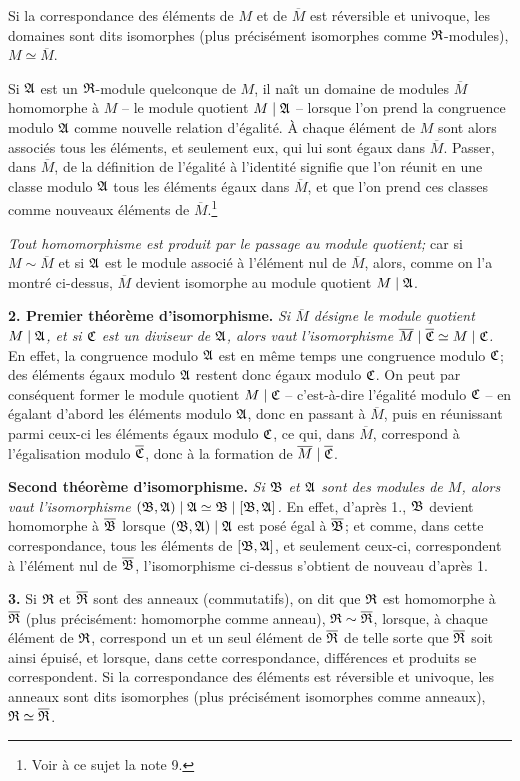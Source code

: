 Si la correspondance des éléments de $M$ et de $\overline M$ est réversible et univoque, les domaines sont dits isomorphes (plus précisément isomorphes comme $\mathfrak{R}$-modules), $M\simeq\overline M$.

Si $\mathfrak{A}$ est un $\mathfrak{R}$-module quelconque de $M$, il naît un domaine de modules $\overline M$ homomorphe à $M$ -- le module quotient $M\mid\mathfrak{A}$ -- lorsque l'on prend la congruence modulo $\mathfrak{A}$ comme nouvelle relation d'égalité. À chaque élément de $M$ sont alors associés tous les éléments, et seulement eux, qui lui sont égaux dans $\overline M$. Passer, dans $\overline M$, de la définition de l'égalité à l'identité signifie que l'on réunit en une classe modulo $\mathfrak{A}$ tous les éléments égaux dans $\overline M$, et que l'on prend ces classes comme nouveaux éléments de $\overline M$.\footnote{Voir à ce sujet la note 9.}

\emph{Tout homomorphisme est produit par le passage au module quotient;} car si $M\sim\overline M$ et si $\mathfrak{A}$ est le module associé à l'élément nul de $\overline M$, alors, comme on l'a montré ci-dessus, $\overline M$ devient isomorphe au module quotient $M\mid\mathfrak{A}$.

\textbf{2. Premier théorème d'isomorphisme.} \emph{Si $\overline M$ désigne le module quotient $M\mid\mathfrak{A}$, et si $\mathfrak{C}$ est un diviseur de $\mathfrak{A}$, alors vaut l'isomorphisme $\overline M\mid\overline{\mathfrak{C}}\simeq M\mid\mathfrak{C}$.} En effet, la congruence modulo $\mathfrak{A}$ est en même temps une congruence modulo $\mathfrak{C}$; des éléments égaux modulo $\mathfrak{A}$ restent donc égaux modulo $\mathfrak{C}$. On peut par conséquent former le module quotient $M\mid\mathfrak{C}$ -- c'est-à-dire l'égalité modulo $\mathfrak{C}$ -- en égalant d'abord les éléments modulo $\mathfrak{A}$, donc en passant à $\overline M$, puis en réunissant parmi ceux-ci les éléments égaux modulo $\mathfrak{C}$, ce qui, dans $\overline M$, correspond à l'égalisation modulo $\overline{\mathfrak{C}}$, donc à la formation de $\overline M\mid\overline{\mathfrak{C}}$.

\textbf{Second théorème d'isomorphisme.} \emph{Si $\mathfrak{B}$ et $\mathfrak{A}$ sont des modules de $M$, alors vaut l'isomorphisme $(\mathfrak{B},\mathfrak{A})\mid\mathfrak{A}\simeq \mathfrak{B}\mid[\mathfrak{B},\mathfrak{A}]$.} En effet, d'après 1., $\mathfrak{B}$ devient homomorphe à $\overline{\mathfrak{B}}$ lorsque $(\mathfrak{B},\mathfrak{A})\mid\mathfrak{A}$ est posé égal à $\overline{\mathfrak{B}}$; et comme, dans cette correspondance, tous les éléments de $[\mathfrak{B},\mathfrak{A}]$, et seulement ceux-ci, correspondent à l'élément nul de $\overline{\mathfrak{B}}$, l'isomorphisme ci-dessus s'obtient de nouveau d'après 1.

\textbf{3.} Si $\mathfrak{R}$ et $\overline{\mathfrak{R}}$ sont des anneaux (commutatifs), on dit que $\mathfrak{R}$ est homomorphe à $\overline{\mathfrak{R}}$ (plus précisément: homomorphe comme anneau), $\mathfrak{R}\sim\overline{\mathfrak{R}}$, lorsque, à chaque élément de $\mathfrak{R}$, correspond un et un seul élément de $\overline{\mathfrak{R}}$ de telle sorte que $\overline{\mathfrak{R}}$ soit ainsi épuisé, et lorsque, dans cette correspondance, différences et produits se correspondent. Si la correspondance des éléments est réversible et univoque, les anneaux sont dits isomorphes (plus précisément isomorphes comme anneaux), $\mathfrak{R}\simeq\overline{\mathfrak{R}}$.

